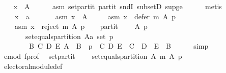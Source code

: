 \begin{isabellebody}
\ \ \isamarkupfalse%
\ {\isachardoublequoteopen}x\ {\isasymin}\ A{\isachardoublequoteclose}\isanewline
\ \ \ \ \isamarkupfalse%
\ asm\ set{\isacharunderscore}{\kern0pt}partit\ partit\ sndI\ subsetD\ sup{\isacharunderscore}{\kern0pt}ge{}\isanewline
\ \ \ \ \isamarkupfalse%
\ metis\isanewline
{}\isamarkupfalse%
\isanewline
\ \ \isamarkupfalse%
\isanewline
\ \ \ \ x\ {\isacharcolon}{\kern0pt}{\isacharcolon}{\kern0pt}\ {\isachardoublequoteopen}{\isacharprime}{\kern0pt}a{\isachardoublequoteclose}\isanewline
\ \ \isamarkupfalse%
\isanewline
\ \ \ \ asm{}{\isacharcolon}{\kern0pt}\ {\isachardoublequoteopen}x\ {\isasymin}\ A{\isachardoublequoteclose}\ \isanewline
\ \ \ \ asm{}{\isacharcolon}{\kern0pt}\ {\isachardoublequoteopen}x\ {\isasymnotin}\ defer\ m\ A\ p{\isachardoublequoteclose}\ \isanewline
\ \ \ \ asm{}{\isacharcolon}{\kern0pt}\ {\isachardoublequoteopen}x\ {\isasymnotin}\ reject\ m\ A\ p{\isachardoublequoteclose}\isanewline
\ \ \isamarkupfalse%
\ partit{\isacharcolon}{\kern0pt}\isanewline
\ \ \ \ {\isachardoublequoteopen}{\isasymforall}A\ p{\isachardot}{\kern0pt}\isanewline
\ \ \ \ \ \ {\isasymnot}\ set{\isacharunderscore}{\kern0pt}equals{\isacharunderscore}{\kern0pt}partition\ {\isacharparenleft}{\kern0pt}A{\isacharcolon}{\kern0pt}{\isacharcolon}{\kern0pt}{\isacharprime}{\kern0pt}a\ set{\isacharparenright}{\kern0pt}\ p\ {\isasymor}\isanewline
\ \ \ \ \ \ \ \ {\isacharparenleft}{\kern0pt}{\isasymexists}B\ C\ D\ E{\isachardot}{\kern0pt}\ A\ {\isacharequal}{\kern0pt}\ B\ {\isasymand}\ p\ {\isacharequal}{\kern0pt}\ {\isacharparenleft}{\kern0pt}C{\isacharcomma}{\kern0pt}\ D{\isacharcomma}{\kern0pt}\ E{\isacharparenright}{\kern0pt}\ {\isasymand}\ C\ {\isasymunion}\ D\ {\isasymunion}\ E\ {\isacharequal}{\kern0pt}\ B{\isacharparenright}{\kern0pt}{\isachardoublequoteclose}\isanewline
\ \ \ \ \isamarkupfalse%
\ simp\isanewline
\ \ \isamarkupfalse%
\ e{\isacharunderscore}{\kern0pt}mod\ f{\isacharunderscore}{\kern0pt}prof\ \isamarkupfalse%
\ set{\isacharunderscore}{\kern0pt}partit{\isacharcolon}{\kern0pt}\isanewline
\ \ \ \ {\isachardoublequoteopen}set{\isacharunderscore}{\kern0pt}equals{\isacharunderscore}{\kern0pt}partition\ A\ {\isacharparenleft}{\kern0pt}m\ A\ p{\isacharparenright}{\kern0pt}{\isachardoublequoteclose}\isanewline
\ \ \ \ \isamarkupfalse%
\ electoral{\isacharunderscore}{\kern0pt}module{\isacharunderscore}{\kern0pt}def\isanewline

\end{isabellebody}
